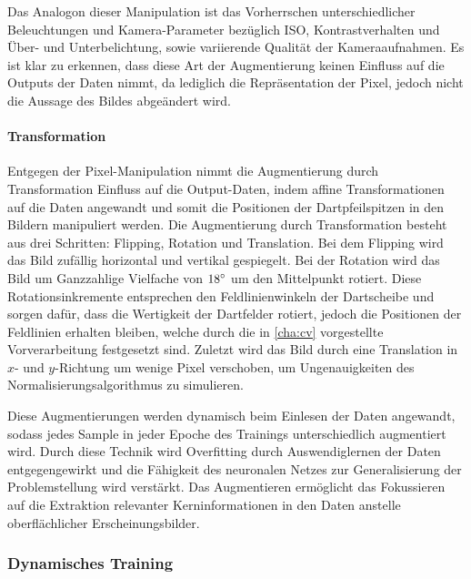 Das Analogon dieser Manipulation ist das Vorherrschen unterschiedlicher Beleuchtungen und Kamera-Parameter bezüglich ISO, Kontrastverhalten und Über- und Unterbelichtung, sowie variierende Qualität der Kameraaufnahmen. Es ist klar zu erkennen, dass diese Art der Augmentierung keinen Einfluss auf die Outputs der Daten nimmt, da lediglich die Repräsentation der Pixel, jedoch nicht die Aussage des Bildes abgeändert wird.

\paragraph{Transformation}

Entgegen der Pixel-Manipulation nimmt die Augmentierung durch Transformation Einfluss auf die Output-Daten, indem affine Transformationen auf die Daten angewandt und somit die Positionen der Dartpfeilspitzen in den Bildern manipuliert werden. Die Augmentierung durch Transformation besteht aus drei Schritten: Flipping, Rotation und Translation. Bei dem Flipping wird das Bild zufällig horizontal und vertikal gespiegelt. Bei der Rotation wird das Bild um Ganzzahlige Vielfache von $18^{\circ}$ um den Mittelpunkt rotiert. Diese Rotationsinkremente entsprechen den Feldlinienwinkeln der Dartscheibe und sorgen dafür, dass die Wertigkeit der Dartfelder rotiert, jedoch die Positionen der Feldlinien erhalten bleiben, welche durch die in \autoref{cha:cv} vorgestellte Vorverarbeitung festgesetzt sind. Zuletzt wird das Bild durch eine Translation in $x$- und $y$-Richtung um wenige Pixel verschoben, um Ungenauigkeiten des Normalisierungsalgorithmus zu simulieren.

\vspace{\baselineskip}

\noindent Diese Augmentierungen werden dynamisch beim Einlesen der Daten angewandt, sodass jedes Sample in jeder Epoche des Trainings unterschiedlich augmentiert wird. Durch diese Technik wird Overfitting durch Auswendiglernen der Daten entgegengewirkt und die Fähigkeit des neuronalen Netzes zur Generalisierung der Problemstellung wird verstärkt. Das Augmentieren ermöglicht das Fokussieren auf die Extraktion relevanter Kerninformationen in den Daten anstelle oberflächlicher Erscheinungsbilder.

\subsubsection{Dynamisches Training}
\label{sec:dynamisches_training}

